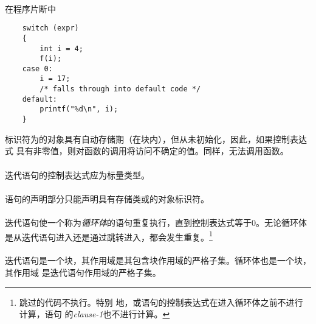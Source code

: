 {\paragraph{}
\ex* 在程序片断中
\begin{lstlisting}
    switch (expr)
    {
        int i = 4;
        f(i);
    case 0:
        i = 17;
        /* falls through into default code */
    default:
        printf("%d\n", i);
    }
\end{lstlisting}
标识符为的对象具有自动存储期（在块内），但从未初始化，因此，如果控制表达式
具有非零值，则对函数的调用将访问不确定的值。同样，无法调用函数。

\syntax
\paragraph{}

\constraint
\paragraph{}
迭代语句的控制表达式应为标量类型。

\paragraph{}
语句的声明部分只能声明具有存储类或的对象标识符。

\semantic
\paragraph{}
迭代语句使一个称为\textit{循环体}的语句重复执行，直到控制表达式等于0。无论循环体
是从迭代语句进入还是通过跳转进入，都会发生重复。\footnote{跳过的代码不执行。特别
地，或语句的控制表达式在进入循环体之前不进行计算，语句
的\textit{clause-1}也不进行计算。}

\paragraph{}
迭代语句是一个块，其作用域是其包含块作用域的严格子集。循环体也是一个块，其作用域
是迭代语句作用域的严格子集。

}
